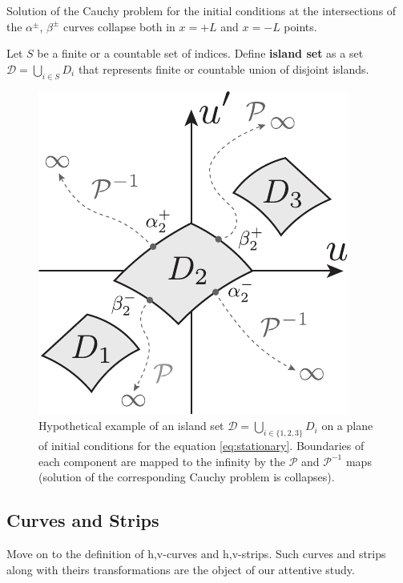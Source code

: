 \begin{remark}
	Solution of the Cauchy problem for the initial conditions at the  intersections of the $\alpha^{\pm}$, $\beta^{\pm}$ curves collapse both in $x = +L$ and $x = -L$ points.
\end{remark}

\begin{definition}
	Let $S$ be a finite or a countable set of indices.
	Define {\bf island set} as a set $\mathcal{D} = \bigcup_{i \in S} D_i$ that represents finite or countable union of disjoint islands.
\label{def:island-set}
\end{definition}

\begin{figure}[h]
\centering
	\includegraphics[scale = 1]{pic/islands set}
	\caption{Hypothetical example of an island set $\mathcal{D} = \bigcup_{i \in \{1, 2, 3\}} D_i$ on a plane of initial conditions for the equation \eqref{eq:stationary}. Boundaries of each component are mapped to the infinity by the $\mathcal{P}$ and $\mathcal{P}^{-1}$ maps (solution of the corresponding Cauchy problem is collapses).}
\label{fig:islands-set}
\end{figure}

\subsection{Curves and Strips}

Move on to the definition of h,v-curves and h,v-strips.
Such curves and strips along with theirs transformations are the object of our attentive study.

